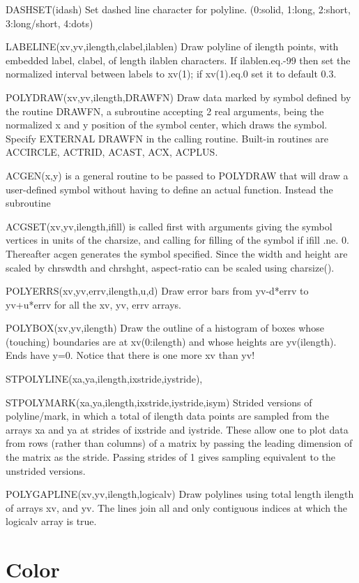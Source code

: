 \documentclass[12pt]{article}
\begin{document}
DASHSET(idash) Set dashed line character for polyline. 
(0:solid, 1:long, 2:short, 3:long/short, 4:dots)

LABELINE(xv,yv,ilength,clabel,ilablen) Draw polyline of ilength
points, with embedded label, clabel, of length ilablen characters. If
ilablen.eq.-99 then set the normalized interval between labels to
xv(1); if xv(1).eq.0 set it to default 0.3.

POLYDRAW(xv,yv,ilength,DRAWFN) Draw data marked by symbol defined by
the routine DRAWFN, a subroutine accepting 2 real arguments, being the
normalized x and y position of the symbol center, which draws the symbol.
Specify EXTERNAL DRAWFN in the calling routine. Built-in routines are
ACCIRCLE, ACTRID, ACAST, ACX, ACPLUS.

ACGEN(x,y) is a general routine to be passed to POLYDRAW that will draw a
user-defined symbol without having to define an actual
function. Instead the subroutine 

ACGSET(xv,yv,ilength,ifill) is called
first with arguments giving the symbol vertices in units of the
charsize, and calling for filling of the symbol if ifill .ne. 0.
Thereafter acgen generates the symbol specified. Since the width and
height are scaled by chrswdth and chrshght, aspect-ratio can be scaled
using charsize().

POLYERRS(xv,yv,errv,ilength,u,d) Draw error bars from yv-d*errv to
yv+u*errv for all the xv, yv, errv arrays.

POLYBOX(xv,yv,ilength) Draw the outline of a histogram of boxes whose
(touching) boundaries are at xv(0:ilength) and whose heights are
yv(ilength). Ends have y=0. Notice that there is one more xv than yv!

STPOLYLINE(xa,ya,ilength,ixstride,iystride),

STPOLYMARK(xa,ya,ilength,ixstride,iystride,isym) Strided versions of
polyline/mark, in which a total of ilength data points are sampled
from the arrays xa and ya at strides of ixstride and iystride. These
allow one to plot data from rows (rather than columns) of a matrix by
passing the leading dimension of the matrix as the stride. Passing
strides of 1 gives sampling equivalent to the unstrided versions.

POLYGAPLINE(xv,yv,ilength,logicalv) Draw polylines using total
length ilength of arrays xv, and yv. The lines join all and only
contiguous indices at which the logicalv array is true.

\section{Color}
\end{document}

